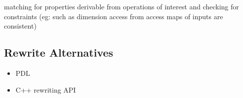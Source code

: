\documentclass[8pt]{extarticle}
\begin{document}
\begin{multicols*}{2}
matching for properties derivable from operations of interest and checking for constraints (eg: such as dimension access from access maps of inputs are consistent)

\subsection{Rewrite Alternatives}
\begin{itemize}
\item PDL
\item C++ rewriting API
\end{itemize}

\vfill\null
\columnbreak



    
\end{multicols*}
\end{document}
